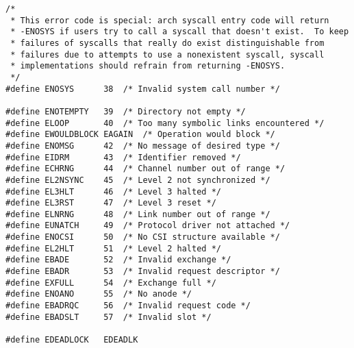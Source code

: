 \begin{verbatim}
/*
 * This error code is special: arch syscall entry code will return
 * -ENOSYS if users try to call a syscall that doesn't exist.  To keep
 * failures of syscalls that really do exist distinguishable from
 * failures due to attempts to use a nonexistent syscall, syscall
 * implementations should refrain from returning -ENOSYS.
 */
#define	ENOSYS		38	/* Invalid system call number */

#define	ENOTEMPTY	39	/* Directory not empty */
#define	ELOOP		40	/* Too many symbolic links encountered */
#define	EWOULDBLOCK	EAGAIN	/* Operation would block */
#define	ENOMSG		42	/* No message of desired type */
#define	EIDRM		43	/* Identifier removed */
#define	ECHRNG		44	/* Channel number out of range */
#define	EL2NSYNC	45	/* Level 2 not synchronized */
#define	EL3HLT		46	/* Level 3 halted */
#define	EL3RST		47	/* Level 3 reset */
#define	ELNRNG		48	/* Link number out of range */
#define	EUNATCH		49	/* Protocol driver not attached */
#define	ENOCSI		50	/* No CSI structure available */
#define	EL2HLT		51	/* Level 2 halted */
#define	EBADE		52	/* Invalid exchange */
#define	EBADR		53	/* Invalid request descriptor */
#define	EXFULL		54	/* Exchange full */
#define	ENOANO		55	/* No anode */
#define	EBADRQC		56	/* Invalid request code */
#define	EBADSLT		57	/* Invalid slot */

#define	EDEADLOCK	EDEADLK


\end{verbatim}
